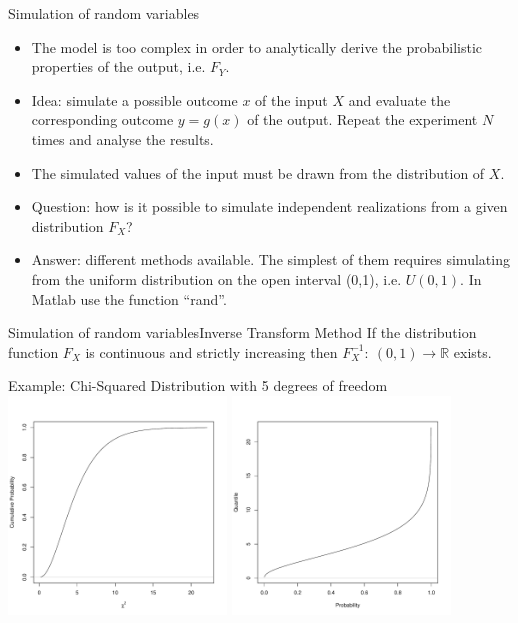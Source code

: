 \documentclass[handout]{beamer}
\begin{document}
\begin{frame}{Simulation of random variables}{}
\begin{itemize}
 \item The model is too complex in order to analytically derive the probabilistic properties of the output, i.e. $F_Y$.
 \item Idea: simulate a possible outcome $x$ of the input $X$ and evaluate the corresponding outcome $y=g(x)$ of the output. Repeat the experiment 
$N$ times and analyse the results.
 \item The simulated values of the input must be drawn from the distribution of $X$.
 \item Question: how is it possible to simulate independent realizations from a given distribution $F_X$?
 \item Answer: different methods available. The simplest of them requires simulating from the uniform distribution on the open interval (0,1), 
  i.e. $U(0,1)$. In Matlab use the function ``rand''.
\end{itemize}
\end{frame}

\begin{frame}{Simulation of random variables}{Inverse Transform Method}
If the distribution function $F_X$ is continuous and strictly increasing then $F_X^{-1}:\ (0,1)\rightarrow \mathbb{R}$ exists. \\
\begin{center}
Example: Chi-Squared Distribution with 5 degrees of freedom
 \includegraphics[width=5.8cm,keepaspectratio=true]{./distChi2.pdf}
 \includegraphics[width=5.8cm,keepaspectratio=true]{./quantileChi2.pdf}
\end{center}
\end{frame}
\end{document}
